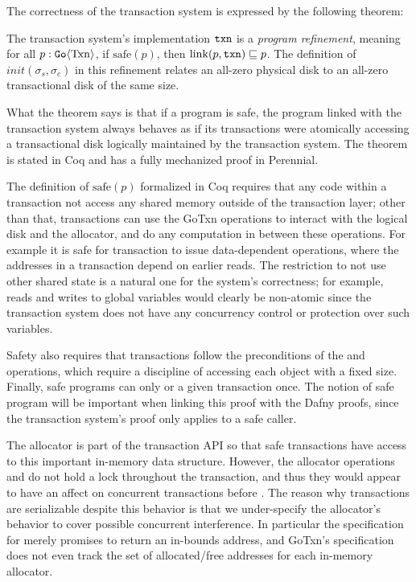 The correctness of the transaction system is expressed by the following theorem:
%
\begin{theorem}
  The transaction system's implementation $\texttt{txn}$ is a \emph{program refinement}, meaning for
  all $p : \mathtt{Go}\langle \mathrm{Txn} \rangle$, if $\mathrm{safe}(p)$, then
  $\mathrm{link}(p, \texttt{txn}) \sqsubseteq p$. The definition of
  $init(\sigma_{s}, \sigma_{c})$ in this refinement relates an all-zero physical
  disk to an all-zero transactional disk of the same size.
  \label{thm:gotxn-program-refinement}
\end{theorem}
%
What the theorem says is that if a program is safe, the program linked with the
transaction system always behaves as if its transactions were atomically
accessing a transactional disk logically maintained by the transaction system.
The theorem is stated in Coq and has a fully mechanized proof in Perennial.

The definition of $\mathrm{safe}(p)$ formalized in Coq requires that any code
within a transaction not access any shared memory outside of the transaction
layer; other than that, transactions can use the GoTxn operations to interact
with the logical disk and the allocator, and do any computation in between these
operations. For example it is safe for transaction to issue data-dependent
operations, where the addresses in a transaction depend on earlier reads. The
restriction to not use other shared state is a natural one for the system's
correctness; for example, reads and writes to global variables would clearly be
non-atomic since the transaction system does not have any concurrency control or
protection over such variables.

Safety also requires that transactions follow the preconditions of the 
and  operations, which require a discipline of accessing each object
with a fixed size. Finally, safe programs can only  or  a
given transaction once. The notion of safe program will be important when
linking this proof with the Dafny proofs, since the transaction system's proof
only applies to a safe caller.

The allocator is part of the transaction API so that safe transactions have
access to this important in-memory data structure. However, the allocator
operations  and  do not hold a lock throughout the
transaction, and thus they would appear to have an affect on concurrent
transactions before . The reason why transactions are serializable
despite this behavior is that we under-specify the allocator's behavior to cover
possible concurrent interference. In particular the specification for 
merely promises to return an in-bounds address, and GoTxn's specification does
not even track the set of allocated/free addresses for each in-memory allocator.

